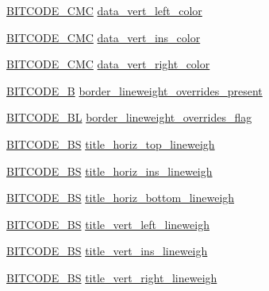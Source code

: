 \begin{DoxyCompactItemize}
\item 
\hyperlink{dwg_8h_add86ce54dd5e62c8f7f5a870b467919a}{\-B\-I\-T\-C\-O\-D\-E\-\_\-\-C\-M\-C} \hyperlink{struct__dwg__entity__TABLE_a78dc1cce54e5b3165247938513bf2cde}{data\-\_\-vert\-\_\-left\-\_\-color}
\item 
\hyperlink{dwg_8h_add86ce54dd5e62c8f7f5a870b467919a}{\-B\-I\-T\-C\-O\-D\-E\-\_\-\-C\-M\-C} \hyperlink{struct__dwg__entity__TABLE_a28a77ccc7ae95b6a19eccd424a19a670}{data\-\_\-vert\-\_\-ins\-\_\-color}
\item 
\hyperlink{dwg_8h_add86ce54dd5e62c8f7f5a870b467919a}{\-B\-I\-T\-C\-O\-D\-E\-\_\-\-C\-M\-C} \hyperlink{struct__dwg__entity__TABLE_aa698b18da90a72769f8da317cc33362b}{data\-\_\-vert\-\_\-right\-\_\-color}
\item 
\hyperlink{dwg_8h_ab533b1f62d9086749e3bb5b67e9f224e}{\-B\-I\-T\-C\-O\-D\-E\-\_\-\-B} \hyperlink{struct__dwg__entity__TABLE_ab6a68c6cfd891f179177d7f8d28e3cda}{border\-\_\-lineweight\-\_\-overrides\-\_\-present}
\item 
\hyperlink{dwg_8h_aebd5f127038868cbabc3d55d91da776c}{\-B\-I\-T\-C\-O\-D\-E\-\_\-\-B\-L} \hyperlink{struct__dwg__entity__TABLE_ae4a092792f0105574d9510de725073be}{border\-\_\-lineweight\-\_\-overrides\-\_\-flag}
\item 
\hyperlink{dwg_8h_a94297606fbd4a4ff97e8add284af0809}{\-B\-I\-T\-C\-O\-D\-E\-\_\-\-B\-S} \hyperlink{struct__dwg__entity__TABLE_ad39c810641f110b91142e887cb7e20ad}{title\-\_\-horiz\-\_\-top\-\_\-lineweigh}
\item 
\hyperlink{dwg_8h_a94297606fbd4a4ff97e8add284af0809}{\-B\-I\-T\-C\-O\-D\-E\-\_\-\-B\-S} \hyperlink{struct__dwg__entity__TABLE_a368d4c4e5b6fcfa2ac5d04246f322f6b}{title\-\_\-horiz\-\_\-ins\-\_\-lineweigh}
\item 
\hyperlink{dwg_8h_a94297606fbd4a4ff97e8add284af0809}{\-B\-I\-T\-C\-O\-D\-E\-\_\-\-B\-S} \hyperlink{struct__dwg__entity__TABLE_a911759f2f959d9d5e26290233bb85a47}{title\-\_\-horiz\-\_\-bottom\-\_\-lineweigh}
\item 
\hyperlink{dwg_8h_a94297606fbd4a4ff97e8add284af0809}{\-B\-I\-T\-C\-O\-D\-E\-\_\-\-B\-S} \hyperlink{struct__dwg__entity__TABLE_aaeadfed58749dcdb4a21b0a348f2d7ed}{title\-\_\-vert\-\_\-left\-\_\-lineweigh}
\item 
\hyperlink{dwg_8h_a94297606fbd4a4ff97e8add284af0809}{\-B\-I\-T\-C\-O\-D\-E\-\_\-\-B\-S} \hyperlink{struct__dwg__entity__TABLE_a765d3b991b95b0ae8d4ca46182e97084}{title\-\_\-vert\-\_\-ins\-\_\-lineweigh}
\item 
\hyperlink{dwg_8h_a94297606fbd4a4ff97e8add284af0809}{\-B\-I\-T\-C\-O\-D\-E\-\_\-\-B\-S} \hyperlink{struct__dwg__entity__TABLE_a0949acba96d7c99cf2ebb64c2a150cb3}{title\-\_\-vert\-\_\-right\-\_\-lineweigh}

\end{DoxyCompactItemize}
